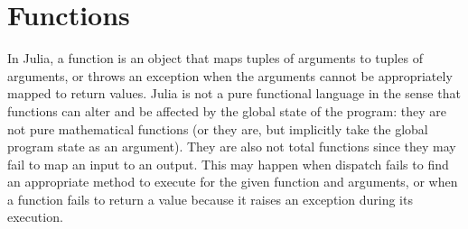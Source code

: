 \documentclass{article}
\renewcommand{\sec}[1]{\label{sec:#1}}
\renewcommand{\O}{\ensuremath{\operatorname{O}}}
\begin{document}
% 
% 
% 
% 

\section{Functions}\sec{functions}

In Julia, a function is an object that maps tuples of arguments to tuples of arguments, or throws an exception when the arguments cannot be appropriately mapped to return values.
Julia is not a pure functional language in the sense that functions can alter and be affected by the global state of the program:
they are not pure mathematical functions (or they are, but implicitly take the global program state as an argument).
They are also not total functions since they may fail to map an input to an output.
This may happen when dispatch fails to find an appropriate method to execute for the given function and arguments, or when a function fails to return a value because it raises an exception during its execution.
\end{document}
